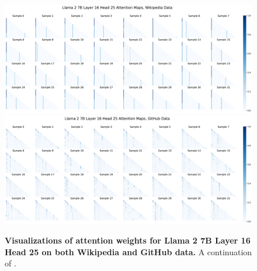 \begin{figure}
    \centering
    \includegraphics[width=\textwidth]{Figures/L16_H25/attn_maps_l16h25_wiki.pdf}
    \includegraphics[width=\textwidth]{Figures/L16_H25/attn_maps_l16h25_github.pdf}
    \caption{\small\textbf{Visualizations of attention weights for Llama 2 7B Layer 16 Head 25 on both Wikipedia and GitHub data.} A continuation of .}
    \label{fig:attn_l16_h25_improved}
\end{figure}

